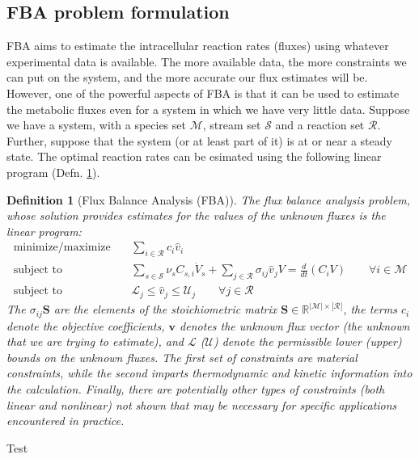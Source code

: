 \documentclass{article}[11pt]
\newtheorem{defn}{Definition}
\def\R{\mathbb{R}}
\begin{document}
\subsection{FBA problem formulation}
FBA aims to estimate the intracellular reaction rates (fluxes) using whatever experimental data is available.
The more available data, the more constraints we can put on the system, and the more accurate our flux estimates will be.
However, one of the powerful aspects of FBA is that it can be used to estimate the metabolic fluxes even for a system in which we have very little data.
Suppose we have a system, with a species set $\mathcal{M}$, stream set $\mathcal{S}$ and a reaction set $\mathcal{R}$. 
Further, suppose that the system (or at least part of it) is at or near a steady state. 
The optimal reaction rates can be esimated using the following linear program (Defn. \ref{defn-fba-concentration}).

\begin{mdframed}
\begin{defn}[Flux Balance Analysis (FBA)]\label{defn-fba-concentration}
The flux balance analysis problem, whose solution provides estimates for the values of the unknown fluxes is the linear program: 
\begin{eqnarray*}
\text{minimize/maximize}~& & \sum_{i\in\mathcal{R}}c_{i}\hat{v}_{i}\\
\text{subject to} & & \sum_{s\in\mathcal{S}}\nu_{s}C_{s,i}\dot{V}_{s} + \sum_{j\in\mathcal{R}}\sigma_{ij}\hat{v}_{j}V = \frac{d}{dt}\left(C_{i}V\right)\qquad\forall{i\in\mathcal{M}}\\
\text{subject to} & & \mathcal{L}_{j}\leq\hat{v}_{j}\leq\mathcal{U}_{j}\qquad\forall{j\in\mathcal{R}}
\end{eqnarray*}
The $\sigma_{ij}\mathbf{S}$ are the elements of the  stoichiometric matrix $\mathbf{S}\in\R^{|\mathcal{M}|\times|\mathcal{R}|}$, 
the terms $c_{i}$ denote the objective coefficients, 
$\mathbf{v}$ denotes the unknown flux vector (the unknown that we are trying to estimate), and 
$\mathcal{L}$ ($\mathcal{U}$) denote the permissible lower (upper) bounds on the unknown fluxes. 
The first set of constraints are material constraints, 
while the second imparts thermodynamic and kinetic information into the calculation. 
Finally, there are potentially other types of constraints (both linear and nonlinear) not shown 
that may be necessary for specific applications encountered in practice.
\end{defn}
\end{mdframed}

Test



\end{document}
